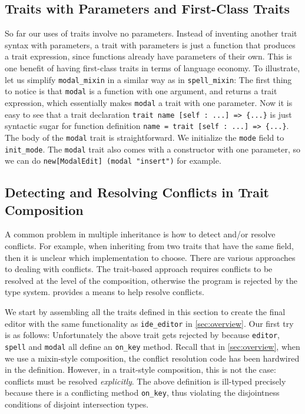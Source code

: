 \subsection{Traits with Parameters and First-Class Traits}\label{subsec:cons}

So far our uses of traits involve no parameters. Instead of inventing another trait
syntax with parameters, a trait with parameters is just a function that produces
a trait expression, since functions already have parameters of their own. This
is one benefit of having first-class traits in terms of language economy. To
illustrate, let us simplify \lstinline{modal_mixin} in a similar way as in \lstinline{spell_mixin}:
The first thing to notice is that \lstinline{modal} is a function with one
argument, and returns a trait expression, which essentially makes
\lstinline{modal} a trait with one parameter.
Now it is easy to see that a trait declaration
\lstinline$trait name [self : ...] => {...}$ is just syntactic sugar for
function definition \lstinline$name = trait [self : ...] => {...}$. The body of
the \lstinline{modal} trait is straightforward. We initialize the
\lstinline{mode} field to \lstinline{init_mode}.
The \lstinline{modal} trait also comes with a constructor with one parameter,
so we can do \lstinline{new[ModalEdit] (modal "insert")} for example.

\subsection{Detecting and Resolving Conflicts in Trait Composition}

A common problem in multiple inheritance is how to detect and/or resolve conflicts. For example, when
inheriting from two traits that have the same field, then it is unclear which
implementation to choose. There are various approaches to dealing with
conflicts. The trait-based approach requires conflicts to be resolved at the
level of the composition, otherwise the program is rejected by
the type system. \name provides a means to help resolve conflicts.

We start by assembling all the traits defined in this section
to create the final editor with the same functionality as
\lstinline{ide_editor} in \cref{sec:overview}. Our first try is as follows:
Unfortunately the above trait gets rejected by \name because
\lstinline{editor}, \lstinline{spell} and \lstinline{modal} all define an \lstinline{on_key} method.
Recall that in \cref{sec:overview}, when we use a mixin-style composition,
the conflict resolution code has been hardwired in the definition.
However, in a trait-style composition, this is not the case: conflicts must be resolved \emph{explicitly}.
The
above definition is ill-typed precisely because there is a conflicting
method \lstinline{on_key}, thus violating the disjointness conditions
of disjoint intersection types.

